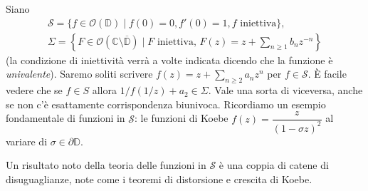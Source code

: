 Siano
\begin{gather*}
  \mathcal{S}=\{f \in \mathcal{O}(\mathbb{D}) \mid f(0)=0, f'(0)=1, f \text{ iniettiva}\}, \\
\Sigma=\left\{F \in \mathcal{O}(\mathbb{C}\setminus \overline{\mathbb{D}}) \mid F \text{ iniettiva, } F(z)=z+\sum_{n \ge 1}b_nz^{-n}\right\}
\end{gather*}
(la condizione di iniettività verrà a volte indicata dicendo che la funzione è \textit{univalente}). Saremo soliti scrivere $f(z)=\displaystyle z+\sum_{n \ge 2}a_nz^n$ per $f \in \mathcal{S}$. È facile vedere che se $f \in S$ allora $1/f(1/z)+a_2 \in \Sigma$. Vale una sorta di viceversa, anche se non c'è esattamente corrispondenza biunivoca. Ricordiamo un esempio fondamentale di funzioni in $\mathcal{S}$: le funzioni di Koebe $f(z)=\dfrac{z}{(1-\sigma z)^2}$ al variare di $\sigma \in \partial \mathbb{D}$.

Un risultato noto della teoria delle funzioni in $\mathcal{S}$ è una coppia di catene di disuguaglianze, note come i teoremi di distorsione e crescita di Koebe.

